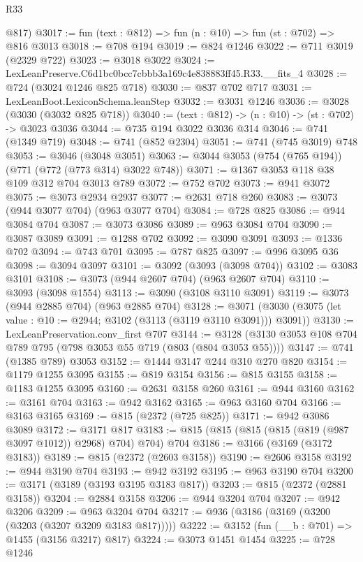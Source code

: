 \begin{lexlean}{R33}
\begin{coremodule}
      @817)
@3017 := fun (text : @812) => fun (n : @10) => fun (st : @702) => @816 @3013
@3018 := @708 @194
@3019 := @824 @1246
@3022 := @711 @3019 (@2329 @722)
@3023 := @3018 @3022
@3024 := LexLeanPreserve.C6d1bc0bcc7cbbb3a169c4e838883ff45.R33.__fits_4
@3028 := @724 (@3024 @1246 @825 @718)
@3030 := @837 @702 @717
@3031 := LexLeanBoot.LexiconSchema.leanStep
@3032 := @3031 @1246
@3036 := @3028 (@3030 (@3032 @825 @718))
@3040 := (text : @812) -> (n : @10) -> (st : @702) -> @3023 @3036
@3044 := @735 @194 @3022 @3036 @314
@3046 := @741 (@1349 @719)
@3048 := @741 (@852 @2304)
@3051 := @741 (@745 @3019) @748
@3053 := @3046 (@3048 @3051)
@3063 := @3044 @3053 (@754 (@765 @194)) (@771 (@772 (@773 @314) @3022 @748))
@3071 := @1367 @3053 @118 @38 @109 @312 @704 @3013 @789
@3072 := @752 @702
@3073 := @941 @3072
@3075 := @3073 @2934 @2937
@3077 := @2631 @718 @260
@3083 := @3073 (@944 @3077 @704) (@963 @3077 @704)
@3084 := @728 @825
@3086 := @944 @3084 @704
@3087 := @3073 @3086
@3089 := @963 @3084 @704
@3090 := @3087 @3089
@3091 := @1288 @702
@3092 := @3090 @3091
@3093 := @1336 @702
@3094 := @743 @701
@3095 := @787 @825
@3097 := @996 @3095 @36
@3098 := @3094 @3097
@3101 := @3092 (@3093 (@3098 @704))
@3102 := @3083 @3101
@3108 := @3073 (@944 @2607 @704) (@963 @2607 @704)
@3110 := @3093 (@3098 @1554)
@3113 := @3090 (@3108 @3110 @3091)
@3119 := @3073 (@944 @2885 @704) (@963 @2885 @704)
@3128 := @3071 (@3030 (@3075 (let value : @10 := @2944; @3102 (@3113 (@3119 @3110 @3091))) @3091))
@3130 := LexLeanPreservation.conv_first @707
@3144 := @3128 (@3130 @3053 @108 @704 @789 @795 (@798 @3053 @55 @719 (@803 (@804 @3053 @55))))
@3147 := @741 (@1385 @789) @3053
@3152 := @1444 @3147 @244 @310 @270 @820
@3154 := @1179 @1255 @3095
@3155 := @819 @3154
@3156 := @815 @3155
@3158 := @1183 @1255 @3095
@3160 := @2631 @3158 @260
@3161 := @944 @3160
@3162 := @3161 @704
@3163 := @942 @3162
@3165 := @963 @3160 @704
@3166 := @3163 @3165
@3169 := @815 (@2372 (@725 @825))
@3171 := @942 @3086 @3089
@3172 := @3171 @817
@3183 := @815 (@815 (@815 (@815 (@819 (@987 @3097 @1012)) @2968) @704) @704) @704
@3186 := @3166 (@3169 (@3172 @3183))
@3189 := @815 (@2372 (@2603 @3158))
@3190 := @2606 @3158
@3192 := @944 @3190 @704
@3193 := @942 @3192
@3195 := @963 @3190 @704
@3200 := @3171 (@3189 (@3193 @3195 @3183 @817))
@3203 := @815 (@2372 (@2881 @3158))
@3204 := @2884 @3158
@3206 := @944 @3204 @704
@3207 := @942 @3206
@3209 := @963 @3204 @704
@3217 := @936 (@3186 (@3169 (@3200 (@3203 (@3207 @3209 @3183 @817)))))
@3222 := @3152 (fun (__b : @701) => @1455 (@3156 @3217) @817)
@3224 := @3073 @1451 @1454
@3225 := @728 @1246

\end{coremodule}
\end{lexlean}
